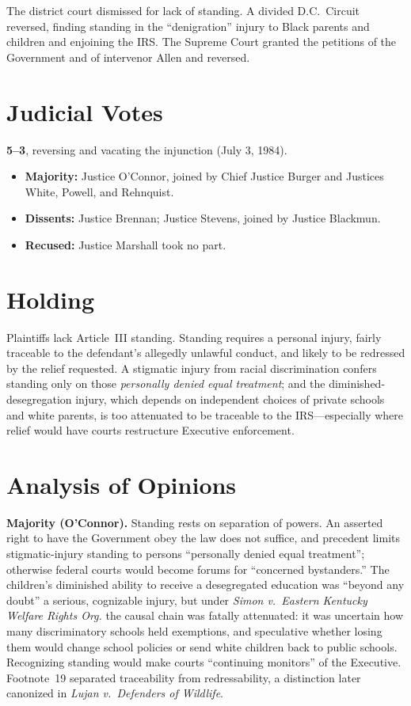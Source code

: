 \documentclass[12pt]{article}
\begin{document}
The district court dismissed for lack of standing. A divided D.C.\ Circuit reversed, finding standing in the ``denigration'' injury to Black parents and children and enjoining the IRS. The Supreme Court granted the petitions of the Government and of intervenor Allen and reversed.

\section{Judicial Votes}

\textbf{5--3}, reversing and vacating the injunction (July 3, 1984).
\begin{itemize}
\item \textbf{Majority:} Justice O'Connor, joined by Chief Justice Burger and Justices White, Powell, and Rehnquist.
\item \textbf{Dissents:} Justice Brennan; Justice Stevens, joined by Justice Blackmun.
\item \textbf{Recused:} Justice Marshall took no part.
\end{itemize}

\section{Holding}

Plaintiffs lack Article~III standing. Standing requires a personal injury, fairly traceable to the defendant's allegedly unlawful conduct, and likely to be redressed by the relief requested. A stigmatic injury from racial discrimination confers standing only on those \textit{personally denied equal treatment}; and the diminished-desegregation injury, which depends on independent choices of private schools and white parents, is too attenuated to be traceable to the IRS---especially where relief would have courts restructure Executive enforcement.

\section{Analysis of Opinions}

\textbf{Majority (O'Connor).} Standing rests on separation of powers. An asserted right to have the Government obey the law does not suffice, and precedent limits stigmatic-injury standing to persons ``personally denied equal treatment''; otherwise federal courts would become forums for ``concerned bystanders.'' The children's diminished ability to receive a desegregated education was ``beyond any doubt'' a serious, cognizable injury, but under \textit{Simon v.\ Eastern Kentucky Welfare Rights Org.} the causal chain was fatally attenuated: it was uncertain how many discriminatory schools held exemptions, and speculative whether losing them would change school policies or send white children back to public schools. Recognizing standing would make courts ``continuing monitors'' of the Executive. Footnote~19 separated traceability from redressability, a distinction later canonized in \textit{Lujan v.\ Defenders of Wildlife}.
\end{document}
